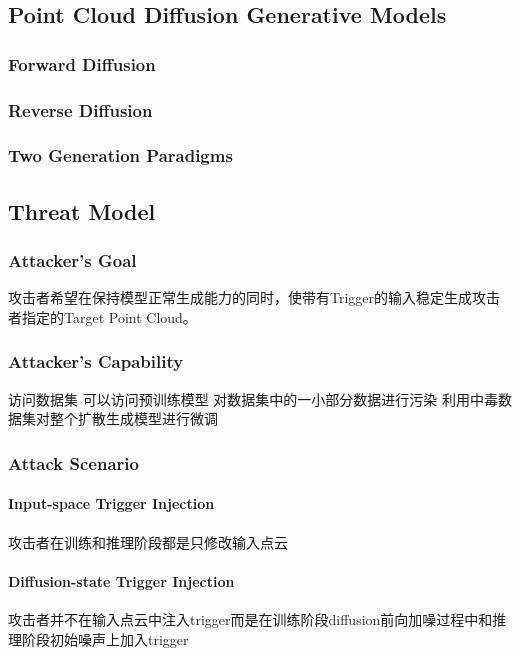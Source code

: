 \documentclass[UTF8,a4paper,11pt]{ctexart}
\newcommand{\subsubsubsection}[1]{\paragraph{#1}\mbox{}\par}
\begin{document}
\subsection{Point Cloud Diffusion Generative Models}


\subsubsection{Forward Diffusion}

\subsubsection{Reverse Diffusion}

\subsubsection{Two Generation Paradigms}

\subsection{Threat Model}


\subsubsection{Attacker's Goal}
攻击者希望在保持模型正常生成能力的同时，使带有Trigger的输入稳定生成攻击者指定的Target Point Cloud。

\subsubsection{Attacker's Capability}


访问数据集
可以访问预训练模型
对数据集中的一小部分数据进行污染
利用中毒数据集对整个扩散生成模型进行微调



\subsubsection{Attack Scenario}
\subsubsubsection{Input-space Trigger Injection}
攻击者在训练和推理阶段都是只修改输入点云

\subsubsubsection{Diffusion-state Trigger Injection}

攻击者并不在输入点云中注入trigger而是在训练阶段diffusion前向加噪过程中和推理阶段初始噪声上加入trigger
\end{document}
